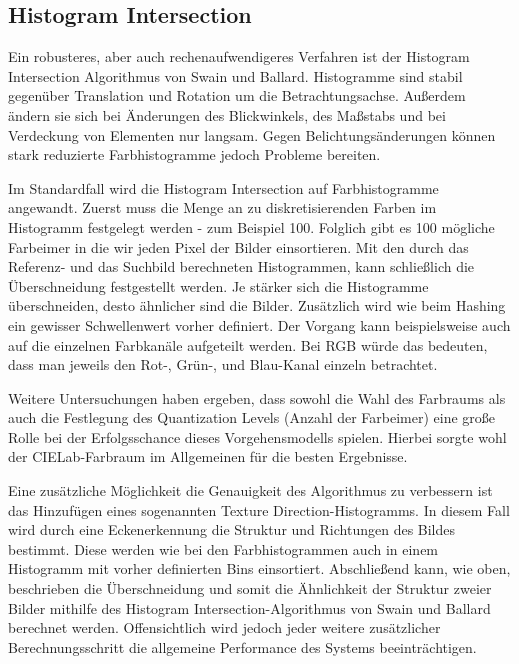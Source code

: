 \subsection{Histogram Intersection}
Ein robusteres, aber auch rechenaufwendigeres Verfahren ist der Histogram
Intersection Algorithmus von Swain und Ballard. Histogramme sind stabil
gegenüber Translation und Rotation um die Betrachtungsachse. Außerdem ändern
sie sich bei Änderungen des Blickwinkels, des Maßstabs und bei Verdeckung von
Elementen nur langsam. Gegen Belichtungsänderungen können stark reduzierte
Farbhistogramme jedoch Probleme bereiten. 

Im Standardfall wird die Histogram Intersection auf Farbhistogramme angewandt. 
Zuerst muss die Menge an zu diskretisierenden Farben im Histogramm festgelegt
werden - zum Beispiel 100. Folglich gibt es 100 mögliche \glqq{}Farbeimer\grqq{}
in die wir jeden Pixel der Bilder einsortieren. Mit den durch das Referenz- und
das Suchbild berechneten Histogrammen, kann schließlich die Überschneidung
festgestellt werden. Je stärker sich die Histogramme überschneiden, desto
ähnlicher sind die Bilder. Zusätzlich wird wie beim Hashing ein gewisser
Schwellenwert vorher definiert. Der Vorgang kann beispielsweise auch auf die
einzelnen Farbkanäle aufgeteilt werden. Bei RGB würde das bedeuten, dass man
jeweils den Rot-, Grün-, und Blau-Kanal einzeln betrachtet. 

Weitere Untersuchungen haben ergeben, dass sowohl die Wahl des Farbraums als
auch die Festlegung des Quantization Levels (Anzahl der Farbeimer) eine große
Rolle bei der Erfolgsschance dieses Vorgehensmodells spielen. Hierbei sorgte
wohl der CIELab-Farbraum im Allgemeinen für die besten Ergebnisse.

Eine zusätzliche Möglichkeit die Genauigkeit des Algorithmus zu verbessern ist
das Hinzufügen eines sogenannten \glqq{}Texture Direction\grqq{}-Histogramms. In
diesem Fall wird durch eine Eckenerkennung die Struktur und Richtungen des
Bildes bestimmt. Diese werden wie bei den Farbhistogrammen auch in einem
Histogramm mit vorher definierten Bins einsortiert. Abschließend kann, wie oben,
beschrieben die Überschneidung und somit die Ähnlichkeit der Struktur zweier
Bilder mithilfe des \glqq{}Histogram Intersection\grqq{}-Algorithmus von Swain
und Ballard berechnet werden. Offensichtlich wird jedoch jeder weitere 
zusätzlicher Berechnungsschritt die allgemeine Performance des Systems
beeinträchtigen.